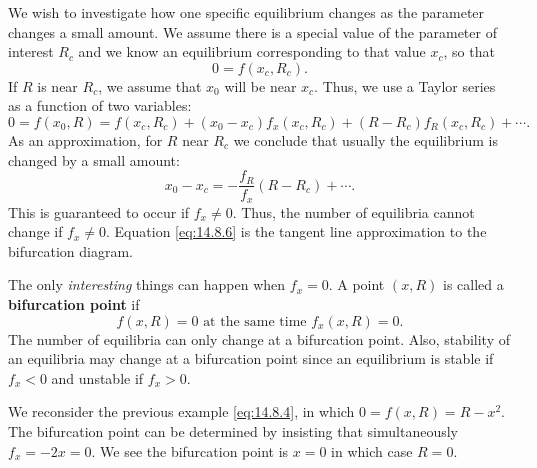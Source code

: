 We wish to investigate how one specific equilibrium changes as the parameter changes a small amount. We assume there is a special value of the parameter of interest $R_c$ and we know an equilibrium corresponding to that value $x_c$, so that
\[
0 = f(x_c, R_c).
\]
If $R$ is near $R_c$, we assume that $x_0$ will be near $x_c$. Thus, we use a Taylor series as a function of two variables:
\[
0 = f(x_0, R) = f(x_c, R_c) + (x_0 - x_c)f_x(x_c, R_c) + (R - R_c)f_R(x_c, R_c) + \cdots.
\]
As an approximation, for $R$ near $R_c$ we conclude that usually the equilibrium is changed by a small amount:
\begin{equation}
x_0 - x_c = -\frac{f_R}{f_x}(R - R_c) + \cdots.
\label{eq:14.8.6}
\end{equation}
This is guaranteed to occur if $f_x \neq 0$. Thus, the number of equilibria cannot change if $f_x \neq 0$. Equation \eqref{eq:14.8.6} is the tangent line approximation to the bifurcation diagram.

The only \emph{interesting} things can happen when $f_x = 0$. A point $(x, R)$ is called a \textbf{bifurcation point} if
\begin{equation}
\boxed{f(x, R) = 0 \text{ at the same time } f_x(x, R) = 0.}
\label{eq:14.8.7}
\end{equation}
The number of equilibria can only change at a bifurcation point. Also, stability of an equilibria may change at a bifurcation point since an equilibrium is stable if $f_x < 0$ and unstable if $f_x > 0$.

We reconsider the previous example \eqref{eq:14.8.4}, in which $0 = f(x,R) = R - x^2$. The bifurcation point can be determined by insisting that simultaneously $f_x = -2x = 0$. We see the bifurcation point is $x = 0$ in which case $R = 0$.

